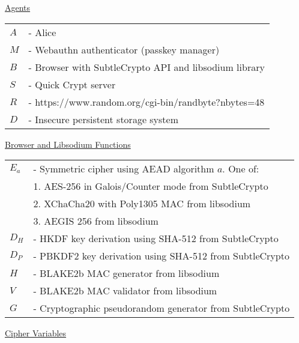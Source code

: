 \documentclass{article}
\begin{document}
\underline{Agents}\\

\begin{tabular}{@{}p{2mm} l}
$A$ & \textrm{ - Alice} \\
$M$ & \textrm{ - Webauthn authenticator (passkey manager)} \\
$B$ & \textrm{ - Browser with SubtleCrypto API and libsodium library} \\
$S$ & \textrm{ - Quick Crypt server} \\
$R$ & \textrm{ - https://www.random.org/cgi-bin/randbyte?nbytes=48} \\
$D$ & \textrm{ - Insecure persistent storage system} \\
\end{tabular}
      
\hfill \break


\underline{Browser and Libsodium Functions}\\

\begin{tabular}{@{}p{2mm} l}
$E_a$ & \textrm{ - Symmetric cipher using AEAD algorithm }$a$\textrm{. One of:}\\
& \hspace{23pt}\textrm{1. AES-256 in Galois/Counter mode from SubtleCrypto} \\
& \hspace{23pt}\textrm{2. XChaCha20 with Poly1305 MAC from libsodium} \\
& \hspace{23pt}\textrm{3. AEGIS 256 from libsodium} \\
$D_H$ & \textrm{ - HKDF key derivation using SHA-512 from SubtleCrypto} \\
$D_P$ & \textrm{ - PBKDF2 key derivation using SHA-512 from SubtleCrypto} \\
$H$ & \textrm{ - BLAKE2b MAC generator from libsodium} \\
$V$ & \textrm{ - BLAKE2b MAC validator from libsodium} \\
$G$ & \textrm{ - Cryptographic pseudorandom generator from SubtleCrypto} \\
\end{tabular}

\hfill \break

\underline{Cipher Variables}\\
\end{document}
